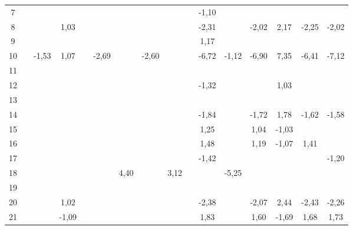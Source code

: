 \documentclass[a4paper, 11pt]{article}
\begin{document}
\begin{multicols}{2}
\begin{table}[t]
{\begin{tabular}{|c|c c|c|c c|c c|c c|c|c c|c|cc|}
7 &  &  &  &  &  &  &  &  &  & \cellcolor[HTML]{B4F5F2}-1,10 &  &  &  &  &  \\
8 &  &  & \cellcolor[HTML]{FDFF89}1,03 &  &  &  &  &  &  & \cellcolor[HTML]{B4F5F2}-2,31 &  & \cellcolor[HTML]{B4F5F2}-2,02 & \cellcolor[HTML]{FDFF89}2,17 & \cellcolor[HTML]{B4F5F2}-2,25 & \cellcolor[HTML]{B4F5F2}-2,02 \\
9 &  &  &  &  &  &  &  &  &  & \cellcolor[HTML]{FDFF89}1,17 &  &  &  &  &  \\
10 &  & \cellcolor[HTML]{B4F5F2}-1,53 & \cellcolor[HTML]{FDFF89}1,07 &  & \cellcolor[HTML]{4AD7FF}-2,69 &  & \cellcolor[HTML]{4AD7FF}-2,60 &  &  & \cellcolor[HTML]{6F94FF}-6,72 & \cellcolor[HTML]{B4F5F2}-1,12 & \cellcolor[HTML]{6F94FF}-6,90 & \cellcolor[HTML]{F56B00}7,35 & \cellcolor[HTML]{6F94FF}-6,41 & \cellcolor[HTML]{6F94FF}-7,12 \\
11 &  &  &  &  &  &  &  &  &  &  &  &  &  &  &  \\
12 &  &  &  &  &  &  &  &  &  & \cellcolor[HTML]{B4F5F2}-1,32 &  &  & \cellcolor[HTML]{FDFF89}1,03 &  &  \\
13 &  &  &  &  &  &  &  &  &  &  &  &  &  &  &  \\
14 &  &  &  &  &  &  &  &  &  & \cellcolor[HTML]{B4F5F2}-1,84 &  & \cellcolor[HTML]{B4F5F2}-1,72 & \cellcolor[HTML]{FDFF89}1,78 & \cellcolor[HTML]{B4F5F2}-1,62 & \cellcolor[HTML]{B4F5F2}-1,58 \\
15 &  &  &  &  &  &  &  &  &  & \cellcolor[HTML]{FDFF89}1,25 &  & \cellcolor[HTML]{FDFF89}1,04 & \cellcolor[HTML]{B4F5F2}-1,03 &  &  \\
16 &  &  &  &  &  &  &  &  &  & \cellcolor[HTML]{FDFF89}1,48 &  & \cellcolor[HTML]{FDFF89}1,19 & \cellcolor[HTML]{B4F5F2}-1,07 & \cellcolor[HTML]{FDFF89}1,41 &  \\
17 &  &  &  &  &  &  &  &  &  & \cellcolor[HTML]{B4F5F2}-1,42 &  &  &  &  & \cellcolor[HTML]{B4F5F2}-1,20 \\
18 &  &  &  &  &  & \cellcolor[HTML]{FFC702}4,40 &  & \cellcolor[HTML]{FFC702}3,12 &  &  & \cellcolor[HTML]{6F94FF}-5,25 &  &  &  &  \\
19 &  &  &  &  &  &  &  &  &  &  &  &  &  &  &  \\
20 &  &  & \cellcolor[HTML]{FDFF89}1,02 &  &  &  &  &  &  & \cellcolor[HTML]{B4F5F2}-2,38 &  & \cellcolor[HTML]{B4F5F2}-2,07 & \cellcolor[HTML]{FDFF89}2,44 & \cellcolor[HTML]{B4F5F2}-2,43 & \cellcolor[HTML]{B4F5F2}-2,26 \\
21 &  &  & \cellcolor[HTML]{B4F5F2}-1,09 &  &  &  &  &  &  & \cellcolor[HTML]{FDFF89}1,83 &  & \cellcolor[HTML]{FDFF89}1,60 & \cellcolor[HTML]{B4F5F2}-1,69 & \cellcolor[HTML]{FDFF89}1,68 & \cellcolor[HTML]{FDFF89}1,73 \\

\end{tabular}}
\end{table}
\end{multicols}
\end{document}
